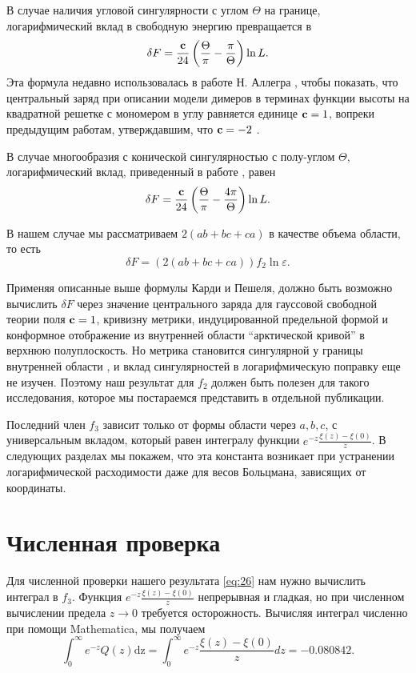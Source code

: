 \documentclass{article}
\newcommand{\dz}{\mathrm{dz}}
\begin{document}
В случае наличия угловой сингулярности с углом $\Theta$ на границе, логарифмический вклад в
свободную энергию превращается в 
\begin{equation}
  \label{eq:86}
  \delta F = \frac{{\bf c}}{24}\left(\frac{\Theta}{\pi}-\frac{\pi}{\Theta}\right) \ln L.
\end{equation}
Эта формула недавно использовалась в работе Н. Аллегра \cite{allegra2015exact}, чтобы показать, что
центральный заряд при описании модели димеров в терминах функции высоты на квадратной решетке с
мономером в углу равняется единице ${\bf c}=1$, вопреки предыдущим работам, утверждавшим, что ${\bf
  c}=-2$ \cite{morin2016integrability}. 

В случае многообразия с конической сингулярностью с полу-углом $\Theta$, логарифмический вклад,
приведенный в работе \cite{cardy1988finite}, равен
\begin{equation}
  \label{eq:91}
  \delta F = \frac{{\bf c}}{24}\left(\frac{\Theta}{\pi}-\frac{4\pi}{\Theta}\right) \ln L.
\end{equation}

В нашем случае мы рассматриваем $2(ab+bc+ca)$ в качестве объема области, то есть
\begin{equation}
  \label{eq:33}
  \delta F = \left(2(ab+bc+ca)\right) f_{2}\ln\varepsilon.
\end{equation}

Применяя описанные выше формулы Карди и Пешеля, должно быть возможно вычислить  $\delta F$ через
значение центрального заряда для гауссовой свободной теории поля ${\bf c}=1$, кривизну метрики,
индуцированной предельной формой и конформное отображение из внутренней области ``арктической
кривой'' в верхнюю полуплоскость. Но метрика становится сингулярной у границы внутренней области
\cite{kenyon2007limit}, и вклад сингулярностей в логарифмическую поправку еще не изучен. Поэтому наш
результат для  $f_2$ должен быть полезен для такого исследования, которое мы постараемся представить
в отдельной публикации.

Последний член $f_{3}$ зависит только от формы области через $a,b,c$, с универсальным вкладом,
который равен интегралу функции  $e^{-z}\frac{\xi(z)-\xi(0)}{z}$. В следующих разделах мы покажем,
что эта константа возникает при устранении логарифмической расходимости даже для весов Больцмана,
зависящих от координаты.

\section{Численная проверка}
\label{sec:numeric-checks}
Для численной проверки нашего результата \eqref{eq:26} нам нужно вычислить интеграл в  $f_{3}$.
Функция  $e^{-z}\frac{\xi(z)-\xi(0)}{z}$ непрерывная и гладкая, но при численном вычислении предела
$z\to 0$ требуется осторожность. Вычисляя интеграл численно при помощи Mathematica, мы получаем
\begin{equation}
  \label{eq:2}
  \int_{0}^{\infty}e^{-z}Q(z)\dz=\int_{0}^{\infty}e^{-z}\frac{\xi(z)-\xi(0)}{z} dz = -0.080842.%
\end{equation}
\end{document}
